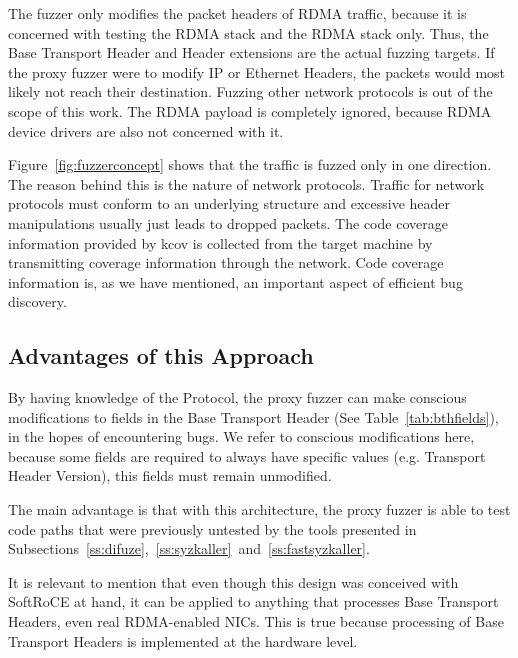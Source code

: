 The fuzzer only modifies the packet headers of RDMA traffic, because it is concerned
with testing the RDMA stack and the RDMA stack only. Thus, the Base Transport Header and Header extensions
are the actual fuzzing targets.  If the proxy fuzzer were to modify IP or Ethernet Headers,
the packets would most likely not reach their destination. Fuzzing other
network protocols is out of the scope of this work. The RDMA payload is completely ignored,
because RDMA device drivers are also not concerned with it. %

Figure~\ref{fig:fuzzerconcept} shows that the traffic is fuzzed only in one direction. The reason
behind this is the nature of network protocols. Traffic for network protocols must conform to an underlying
structure and excessive header manipulations usually just leads to dropped packets. The code coverage information provided by
kcov is collected from the target machine by transmitting coverage information through the network. Code
coverage information is, as we have mentioned, an important aspect of efficient bug discovery.

\subsection{Advantages of this Approach}

By having knowledge of the Protocol, the proxy fuzzer can make conscious modifications to fields in the Base Transport
Header (See Table~\ref{tab:bthfields}), in the hopes of encountering bugs. We refer to conscious modifications here,
because some fields are required to always have specific values (e.g. Transport Header Version), this fields must remain unmodified.

The main advantage is that with this architecture, the proxy fuzzer is able to test code paths
that were previously untested by the tools presented in Subsections~\ref{ss:difuze},~\ref{ss:syzkaller}~and~\ref{ss:fastsyzkaller}.

It is relevant to mention that even though this design was conceived with
SoftRoCE at hand, it can be applied to anything that processes Base
Transport Headers, even real RDMA-enabled NICs. This is true because processing of
Base Transport Headers is implemented at the hardware level.









